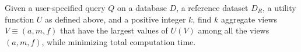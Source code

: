 
\begin{problem}
\vspace{-5pt}
Given a user-specified query $Q$ on a database $D$, a reference dataset $D_R$, 
a utility function $U$ as defined
above, and a positive integer $k$, find $k$ aggregate views $V \equiv (a, m, f)$ that
have the largest values of $U(V)$ among all the views $(a, m, f)$, 
while minimizing total computation time.
\vspace{-5pt}
\end{problem}

